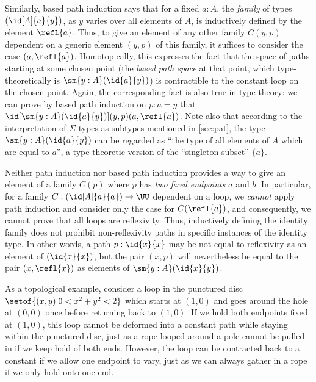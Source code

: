 \begin{rmk}
Similarly, based path induction says that for a fixed $a:A$, the \emph{family} of types $(\id[A]{a}{y})$, as $y$ varies over all elements of $A$, is inductively defined by the element $\refl{a}$.
Thus, to give an element of any other family $C(y,p)$ dependent on a generic element $(y,p)$ of this family, it suffices to consider the case $(a,\refl{a})$.
Homotopically, this expresses the fact that the space of paths starting at some chosen point (the \emph{based path space} at that point, which type-theoretically is $\sm{y:A} (\id{a}{y})$) is contractible to the constant loop on the chosen point.
Again, the corresponding fact is also true in type theory: we can prove by based path induction on $p:a=y$ that $\id[\sm{y:A}(\id{a}{y})]{(y,p)}{(a,\refl{a})}$.
Note also that according to the interpretation of $\Sigma$-types as subtypes mentioned in \cref{sec:pat}, the type $\sm{y:A}(\id{a}{y})$ can be regarded as ``the type of all elements of $A$ which are equal to $a$'', a type-theoretic version of the ``singleton subset'' $\{a\}$.

Neither path induction nor based path induction provides a way to give an element of a family $C(p)$ where $p$ has \emph{two fixed endpoints} $a$ and $b$.
In particular, for a family $C: (\id[A]{a}{a}) \to \UU$ dependent on a loop, we \emph{cannot} apply path induction and consider only the case for $C(\refl{a})$, and consequently, we cannot prove that all loops are reflexivity.
Thus, inductively defining the identity family does not prohibit non-reflexivity paths in specific instances of the identity type.
In other words, a path $p:\id{x}{x}$ may  be not equal to reflexivity as an element of $(\id{x}{x})$, but the pair $(x,p)$ will nevertheless be equal to the pair $(x,\refl{x})$ as elements of $\sm{y:A}(\id{x}{y})$.

As a topological example, consider a loop in the punctured disc $\setof{ (x,y) | 0 < x^2+y^2 < 2 }$ which starts at $(1,0)$ and goes around the hole at $(0,0)$ once before returning back to $(1,0)$.
If we hold both endpoints fixed at $(1,0)$, this loop cannot be deformed into a constant path while staying within the punctured disc, just as a rope looped around a pole cannot be pulled in if we keep hold of both ends.
However, the loop can be contracted back to a constant if we allow one endpoint to vary, just as we can always gather in a rope if we only hold onto one end.
\end{rmk}

%
%

